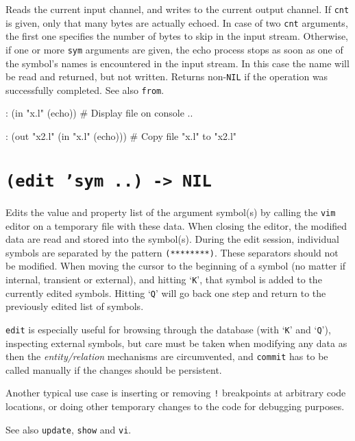 Reads the current input channel, and writes to the current output
channel. If \texttt{cnt} is given, only that many bytes are actually echoed. In
case of two \texttt{cnt} arguments, the first one specifies the number of bytes
to skip in the input stream. Otherwise, if one or more \texttt{sym} arguments
are given, the echo process stops as soon as one of the symbol's names
is encountered in the input stream. In this case the name will be read
and returned, but not written. Returns non-\texttt{NIL} if the operation was
successfully completed. See also \texttt{from}.


\begin{wideverbatim}
: (in "x.l" (echo))  # Display file on console
 ..

: (out "x2.l" (in "x.l" (echo)))  # Copy file "x.l" to "x2.l"
\end{wideverbatim}

 
\section*{\texttt{(edit 'sym ..) -> NIL}}
\label{sec:func-ref-E-(edit 'sym ..) -> NIL}


Edits the value and property list of the argument symbol(s) by calling
the \texttt{vim} editor on a temporary file with these data. When closing the
editor, the modified data are read and stored into the symbol(s). During
the edit session, individual symbols are separated by the pattern
\texttt{(********)}. These separators should not be modified. When moving the
cursor to the beginning of a symbol (no matter if internal, transient or
external), and hitting `\texttt{K}', that symbol is added to the currently
edited symbols. Hitting `\texttt{Q}' will go back one step and return to the
previously edited list of symbols.

\texttt{edit} is especially useful for browsing through the database (with
`\texttt{K}' and `\texttt{Q}'), inspecting external symbols, but care must be taken
when modifying any data as then the \emph{entity/relation}
mechanisms are circumvented, and \texttt{commit} has to be called manually if
the changes should be persistent.

Another typical use case is inserting or removing \texttt{!} breakpoints at
arbitrary code locations, or doing other temporary changes to the code
for debugging purposes.

See also \texttt{update}, \texttt{show} and \texttt{vi}.


